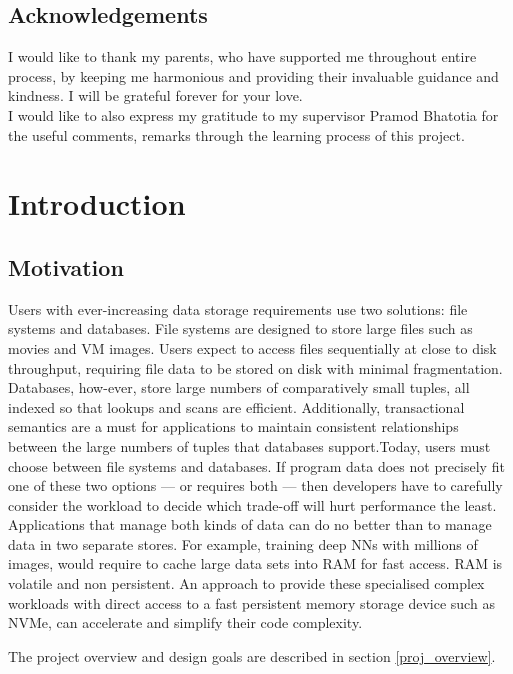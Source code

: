 \documentclass[bsc,frontabs,twoside,singlespacing,parskip,deptreport]{infthesis}     %
\begin{document}
\section*{Acknowledgements}
I would like to thank my parents, who have supported me throughout entire process, by keeping me harmonious and providing their invaluable guidance and kindness. I will be grateful forever for your love.
\\ I would like to also express my gratitude to my supervisor Pramod Bhatotia for the useful comments, remarks through the learning process of this project.

\tableofcontents

\chapter{Introduction}
\section{Motivation}
Users with ever-increasing data storage requirements use two solutions: file systems and databases. File systems are designed to store large files such as movies and VM images. Users expect to access files sequentially at close to disk throughput, requiring file data to be stored on disk with minimal fragmentation. Databases, how-ever, store large numbers of comparatively small tuples, all indexed so that lookups and scans are efficient. Additionally, transactional semantics are a must for applications to maintain consistent relationships between the large numbers of tuples that databases support.Today, users must choose between file systems and databases.  If program data does not precisely fit one of these two options — or requires both — then developers have to carefully consider the workload to decide which trade-off will hurt performance the least. Applications that manage both kinds of data can do no better than to manage data in two separate stores. For example, training deep NNs with millions of images, would require to cache large data sets into RAM for fast access. RAM is volatile and non persistent. An approach to provide these specialised complex workloads with direct access to a fast persistent memory storage device such as NVMe, can accelerate and simplify their code complexity. \cite{pmemkv}

The project overview and design goals are described in section \ref{proj_overview}. 
\end{document}
